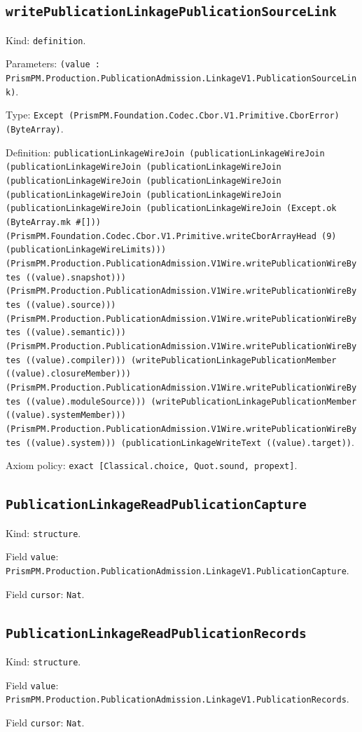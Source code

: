 \documentclass[11pt]{article}
\begin{document}
\subsection*{\texttt{writePublicationLinkagePublicationSourceLink}}
\noindent Kind: \texttt{definition}.\par
\noindent Parameters: \texttt{(value : PrismPM.Production.PublicationAdmission.LinkageV1.PublicationSourceLink)}.\par
\noindent Type: \texttt{Except (PrismPM.Foundation.Codec.Cbor.V1.Primitive.CborError) (ByteArray)}.\par
\noindent Definition: \texttt{publicationLinkageWireJoin (publicationLinkageWireJoin (publicationLinkageWireJoin (publicationLinkageWireJoin (publicationLinkageWireJoin (publicationLinkageWireJoin (publicationLinkageWireJoin (publicationLinkageWireJoin (publicationLinkageWireJoin (publicationLinkageWireJoin (Except.ok (ByteArray.mk \#[])) (PrismPM.Foundation.Codec.Cbor.V1.Primitive.writeCborArrayHead (9) (publicationLinkageWireLimits))) (PrismPM.Production.PublicationAdmission.V1Wire.writePublicationWireBytes ((value).snapshot))) (PrismPM.Production.PublicationAdmission.V1Wire.writePublicationWireBytes ((value).source))) (PrismPM.Production.PublicationAdmission.V1Wire.writePublicationWireBytes ((value).semantic))) (PrismPM.Production.PublicationAdmission.V1Wire.writePublicationWireBytes ((value).compiler))) (writePublicationLinkagePublicationMember ((value).closureMember))) (PrismPM.Production.PublicationAdmission.V1Wire.writePublicationWireBytes ((value).moduleSource))) (writePublicationLinkagePublicationMember ((value).systemMember))) (PrismPM.Production.PublicationAdmission.V1Wire.writePublicationWireBytes ((value).system))) (publicationLinkageWriteText ((value).target))}.\par
\noindent Axiom policy: \texttt{exact [Classical.choice, Quot.sound, propext]}.\par
\subsection*{\texttt{PublicationLinkageReadPublicationCapture}}
\noindent Kind: \texttt{structure}.\par
\noindent Field \texttt{value}: \texttt{PrismPM.Production.PublicationAdmission.LinkageV1.PublicationCapture}.\par
\noindent Field \texttt{cursor}: \texttt{Nat}.\par
\subsection*{\texttt{PublicationLinkageReadPublicationRecords}}
\noindent Kind: \texttt{structure}.\par
\noindent Field \texttt{value}: \texttt{PrismPM.Production.PublicationAdmission.LinkageV1.PublicationRecords}.\par
\noindent Field \texttt{cursor}: \texttt{Nat}.\par
\end{document}
